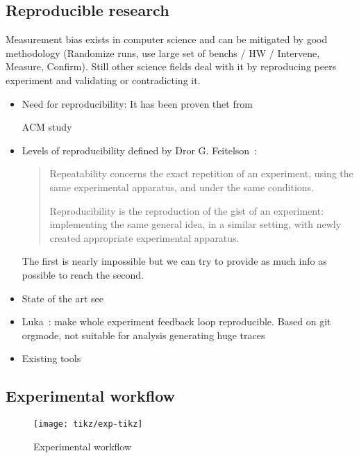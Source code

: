 \subsection{Reproducible research}

Measurement bias \cite{Mytkowicz09Producing} exists in computer science and
can be mitigated by good methodology (Randomize runs, use large set of benchs
/ HW / Intervene, Measure, Confirm). Still other science fields deal with it
by reproducing peers experiment and validating or contradicting it.


\begin{itemize}
    \item Need for reproducibility:
                It has been proven thet from

        ACM study \cite{Collberg15Repeatability}
            \item Levels of reproducibility defined by Dror G. Feitelson~\cite{Feitelson15From}:
        \begin{quotation}
            Repeatability concerns the exact repetition of an experiment, using the same experimental apparatus, and under the same conditions.

            Reproducibility is the reproduction of the gist of an experiment: implementing the same general idea, in a similar setting, with newly created appropriate experimental apparatus.
        \end{quotation}
        The first is nearly impossible but we can try to provide as much info
        as possible to reach the second.
    \item State of the art see \cite[Chapter~3, p17-19]{Stanisic15Reproducible}
    \item Luka~\cite[Chapter~4, p31-44]{Stanisic15Reproducible}: make whole experiment feedback
        loop reproducible. Based on git orgmode, not suitable for analysis
        generating huge traces
    \item Existing tools 
\end{itemize}


\subsection{Experimental workflow}

\begin{figure}[htb]
    \centering
    \texttt{[image: tikz/exp-tikz]}
    \caption{Experimental workflow}
    \label{fig:exp}
\end{figure}

